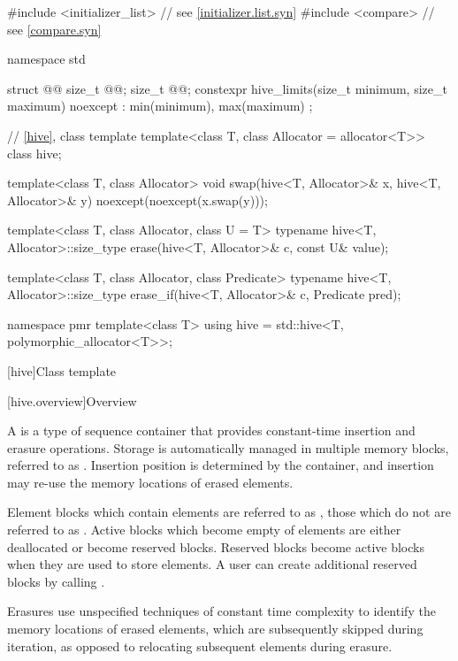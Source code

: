 %
\begin{codeblock}

#include <initializer_list>     // see \ref{initializer.list.syn}
#include <compare>              // see \ref{compare.syn}

namespace std {
  struct @@ {
    size_t @@;
    size_t @@;
    constexpr hive_limits(size_t minimum, size_t maximum) noexcept
      : min(minimum), max(maximum) {}
  };

  // \ref {hive}, class template 
  template<class T, class Allocator = allocator<T>> class hive;

  template<class T, class Allocator>
    void swap(hive<T, Allocator>& x, hive<T, Allocator>& y)
      noexcept(noexcept(x.swap(y)));

  template<class T, class Allocator, class U = T>
    typename hive<T, Allocator>::size_type
      erase(hive<T, Allocator>& c, const U& value);

  template<class T, class Allocator, class Predicate>
    typename hive<T, Allocator>::size_type
      erase_if(hive<T, Allocator>& c, Predicate pred);

  namespace pmr {
    template<class T>
      using hive = std::hive<T, polymorphic_allocator<T>>;
  }
}
\end{codeblock}

[hive]{Class template }

[hive.overview]{Overview}

\pnum
A  is a type of sequence container
that provides constant-time insertion and erasure operations.
Storage is automatically managed in multiple memory blocks,
referred to as .
Insertion position is determined by the container, and insertion
may re-use the memory locations of erased elements.

\pnum
Element blocks which contain elements are referred to
as ,
those which do not are referred to as .
Active blocks which become empty of elements are
either deallocated or become reserved blocks.
Reserved blocks become active blocks when they are used to store elements.
A user can create additional reserved blocks by calling .

\pnum
Erasures use unspecified techniques of constant time complexity
to identify the memory locations of erased elements,
which are subsequently skipped during iteration,
as opposed to relocating subsequent elements during erasure.

